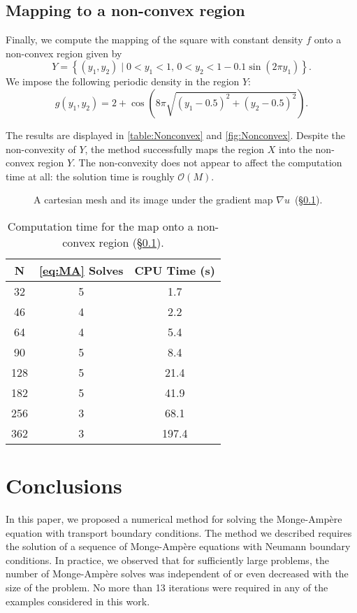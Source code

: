 \documentclass{amsart}
\theoremstyle{lemma}
\theoremstyle{remark}
\begin{document}
\subsection{Mapping to a non-convex region}\label{sec:exNonconvex}
Finally, we compute the mapping of the square with constant density $f$ onto a non-convex region given by
\[ Y = \left\{(y_1,y_2) \mid 0 < y_1 < 1,\, 0 < y_2< 1-0.1\sin(2\pi y_1)\right\}. \]
We impose the following periodic density in the region $Y$:
\[  g(y_1,y_2) = 2 + \cos\left(8\pi\sqrt{(y_1-0.5)^2+(y_2-0.5)^2}\right).\]

The results are displayed in \autoref{table:Nonconvex} and \autoref{fig:Nonconvex}.  Despite the non-convexity of $Y$, the method successfully maps the region $X$ into the non-convex region $Y$.  The non-convexity does not appear to affect the computation time at all: the solution time is roughly ${\mathcal{O}}(M)$. 

\begin{figure}[htdp]
	\centering
  	\vspace*{-12pt}\caption{ A cartesian mesh and  its image under the gradient map $\nabla u$~(\S\ref{sec:exNonconvex}).}
  	\label{fig:Nonconvex}  	
\end{figure} 

\begin{table}[htdp]\small
\begin{center}
\begin{tabular}{ccc}
N   & \eqref{eq:MA} Solves & CPU Time (s)  \\
\hline
32 & 5 & 1.7\\
46 & 4 & 2.2\\
64 & 4 & 5.4\\
90 & 5 & 8.4\\
128 & 5 & 21.4\\
182 & 5 & 41.9\\
256 & 3 & 68.1\\
362 & 3 & 197.4
\end{tabular}
\end{center}
\caption{Computation time for the map onto a non-convex region (\S\ref{sec:exNonconvex}).}
\label{table:Nonconvex}
\end{table}

\section{Conclusions}\label{sec:conclude}
In this paper, we proposed a numerical method for solving the {{Monge-Amp\`ere}\xspace} equation with transport boundary conditions.  The method we described requires the solution of a sequence of {{Monge-Amp\`ere}\xspace} equations with Neumann boundary conditions.  In practice, we observed that for sufficiently large problems, the number of {{Monge-Amp\`ere}\xspace} solves was independent of or even decreased with the size of the problem.  No more than 13 iterations were required in any of the examples considered in this work.
\end{document}
